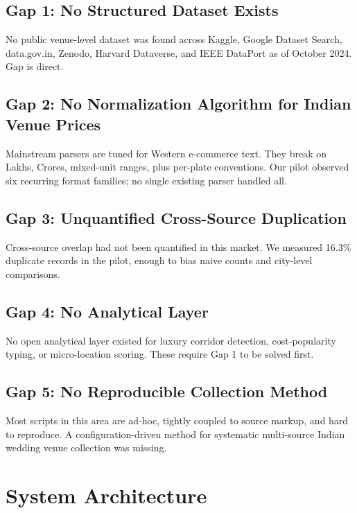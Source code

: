 \documentclass[conference]{IEEEtran}
\begin{document}
\subsection{Gap 1: No Structured Dataset Exists}

No public venue-level dataset was found across Kaggle, Google Dataset Search, data.gov.in, Zenodo, Harvard Dataverse, and IEEE DataPort as of October 2024. Gap is direct.

\subsection{Gap 2: No Normalization Algorithm for Indian Venue Prices}

Mainstream parsers are tuned for Western e-commerce text. They break on Lakhs, Crores, mixed-unit ranges, plus per-plate conventions. Our pilot observed six recurring format families; no single existing parser handled all.

\subsection{Gap 3: Unquantified Cross-Source Duplication}

Cross-source overlap had not been quantified in this market. We measured 16.3\% duplicate records in the pilot, enough to bias naive counts and city-level comparisons.

\subsection{Gap 4: No Analytical Layer}

No open analytical layer existed for luxury corridor detection, cost-popularity typing, or micro-location scoring. These require Gap 1 to be solved first.

\subsection{Gap 5: No Reproducible Collection Method}

Most scripts in this area are ad-hoc, tightly coupled to source markup, and hard to reproduce. A configuration-driven method for systematic multi-source Indian wedding venue collection was missing.


\section{System Architecture}
\end{document}

